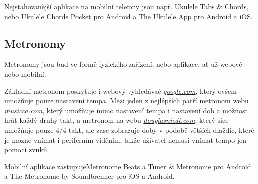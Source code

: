 Nejstahovanější aplikace na mobilní telefony jsou např. Ukulele Tabs \& Chords, nebo Ukulele Chords Pocket pro Android a The Ukulele App pro Android a iOS.

\subsection{Metronomy}
\label{ss:metronomes}
Metronomy jsou buď ve formě fyzického zařízení, nebo aplikace, ať už webové nebo mobilní.

Základní metronom poskytuje i webový vyhledávač \href{www.google.com}{\emph{google.com}}, který ovšem umožňuje pouze nastavení tempa. Mezi jeden z nejlépších patří metronom webu \href{www.musicca.com}{\emph{musicca.com}}, který umožňuje mimo nastavení tempa i nastavení dob a možnost hrát každý druhý takt, a metronom na webu \href{www.douglasniedt.com}{\emph{douglasniedt.com}}, který sice umožňuje pouze 4/4 takt, ale zase zobrazuje doby v podobě větších dlaždic, které je mozné vnímat i periferním viděním, takže uživatel nemusí vnímat tempo jen pomocí zvuků.

Mobilní aplikace zastupujeMetronome Beats a Tuner \& Metronome pro Android a The Metronome by Soundbrenner pro iOS a Android.
